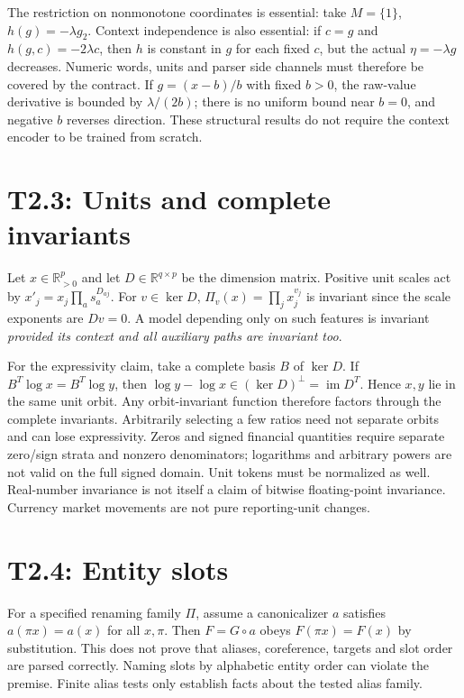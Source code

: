 \documentclass[11pt]{article}
\newcommand{\R}{\mathbb R}
\begin{document}
The restriction on nonmonotone coordinates is essential: take $M=\{1\}$,
$h(g)=-\lambda g_2$. Context independence is also essential: if
$c=g$ and $h(g,c)=-2\lambda c$, then $h$ is constant in $g$ for each
fixed $c$, but the actual $\eta=-\lambda g$ decreases. Numeric words,
units and parser side channels must therefore be covered by the contract.
If $g=(x-b)/b$ with fixed $b>0$, the raw-value derivative is bounded by
$\lambda/(2b)$; there is no uniform bound near $b=0$, and negative $b$
reverses direction. These structural results do not require the context
encoder to be trained from scratch.

\section{T2.3: Units and complete invariants}
Let $x\in\R_{>0}^p$ and let $D\in\R^{q\times p}$ be the dimension
matrix. Positive unit scales act by
$x'_j=x_j\prod_a s_a^{D_{aj}}$. For $v\in\ker D$,
$\Pi_v(x)=\prod_jx_j^{v_j}$ is invariant since the scale exponents
are $Dv=0$. A model depending only on such features is invariant
\emph{provided its context and all auxiliary paths are invariant too}.

For the expressivity claim, take a complete basis $B$ of $\ker D$.
If $B^T\log x=B^T\log y$, then
$\log y-\log x\in(\ker D)^\perp=\operatorname{im}D^T$.
Hence $x,y$ lie in the same unit orbit. Any orbit-invariant function
therefore factors through the complete invariants. Arbitrarily selecting
a few ratios need not separate orbits and can lose expressivity.
Zeros and signed financial quantities require separate zero/sign strata
and nonzero denominators; logarithms and arbitrary powers are not valid
on the full signed domain. Unit tokens must be normalized as well.
Real-number invariance is not itself a claim of bitwise floating-point
invariance. Currency market movements are not pure reporting-unit changes.

\section{T2.4: Entity slots}
For a specified renaming family $\Pi$, assume a canonicalizer $a$ satisfies
$a(\pi x)=a(x)$ for all $x,\pi$. Then $F=G\circ a$ obeys
$F(\pi x)=F(x)$ by substitution. This does not prove that aliases,
coreference, targets and slot order are parsed correctly. Naming slots
by alphabetic entity order can violate the premise. Finite alias tests
only establish facts about the tested alias family.
\end{document}
